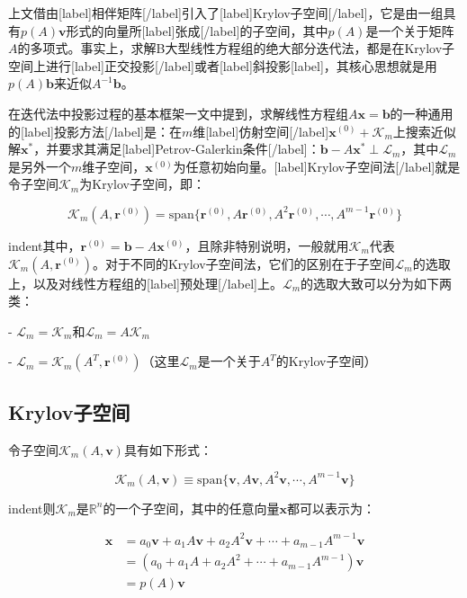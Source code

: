 \documentclass[UTF8,nofonts]{ctexart}
\begin{document}

上文借由[label]相伴矩阵[/label]引入了[label]Krylov子空间[/label]，它是由一组具有$p(A)\boldsymbol{v}$形式的向量所[label]张成[/label]的子空间，其中$p(A)$是一个关于矩阵$A$的多项式。事实上，求解B大型线性方程组的绝大部分迭代法，都是在Krylov子空间上进行[label]正交投影[/label]或者[label]斜投影[label]，其核心思想就是用$p(A)\boldsymbol{b}$来近似$A^{-1}\boldsymbol{b}$。

在迭代法中投影过程的基本框架一文中提到，求解线性方程组$A\boldsymbol{x}=\boldsymbol{b}$的一种通用的[label]投影方法[/label]是：在$m$维[label]仿射空间[/label]$\boldsymbol{x}^{(0)}+\mathcal{K}_m$上搜索近似解$\boldsymbol{x}^\ast$，并要求其满足[label]Petrov-Galerkin条件[/label]：$\boldsymbol{b}-A\boldsymbol{x}^\ast\perp\mathcal{L}_m$，其中$\mathcal{L}_m$是另外一个$m$维子空间，$\boldsymbol{x}^{(0)}$为任意初始向量。[label]Krylov子空间法[/label]就是令子空间$\mathcal{K}_m$为Krylov子空间，即：

\[
\mathcal{K}_m(A,\boldsymbol{r}^{(0)})=\text{span}\{\boldsymbol{r}^{(0)},A\boldsymbol{r}^{(0)},A^2\boldsymbol{r}^{(0)},\cdots,A^{m-1}\boldsymbol{r}^{(0)}\}
\]

indent其中，$\boldsymbol{r}^{(0)}=\boldsymbol{b}-A\boldsymbol{x}^{(0)}$，且除非特别说明，一般就用$\mathcal{K}_m$代表$\mathcal{K}_m(A,\boldsymbol{r}^{(0)})$。对于不同的Krylov子空间法，它们的区别在于子空间$\mathcal{L}_m$的选取上，以及对线性方程组的[label]预处理[/label]上。$\mathcal{L}_m$的选取大致可以分为如下两类：

- $\mathcal{L}_m=\mathcal{K}_m$和$\mathcal{L}_m=A\mathcal{K}_m$

- $\mathcal{L}_m=\mathcal{K}_m(A^T,\boldsymbol{r}^{(0)})$（这里$\mathcal{L}_m$是一个关于$A^T$的Krylov子空间）

\subsection*{Krylov子空间}

令子空间$\mathcal{K}_m(A,\boldsymbol{v})$具有如下形式：

\begin{equation}
\label{eq:kmv}
\mathcal{K}_m(A,\boldsymbol{v})\equiv\text{span}\{\boldsymbol{v},A\boldsymbol{v},A^2\boldsymbol{v},\cdots,A^{m-1}\boldsymbol{v}\}
\end{equation}

indent则$\mathcal{K}_m$是$\mathbb{R}^n$的一个子空间，其中的任意向量$\boldsymbol{x}$都可以表示为：

\begin{align*}
\boldsymbol{x}&=a_0\boldsymbol{v}+a_1A\boldsymbol{v}+a_2A^2\boldsymbol{v}+\cdots+a_{m-1}A^{m-1}\boldsymbol{v} \\
&=(a_0+a_1A+a_2A^2+\cdots+a_{m-1}A^{m-1})\boldsymbol{v} \\
&=p(A)\boldsymbol{v}
\end{align*}
\end{document}
